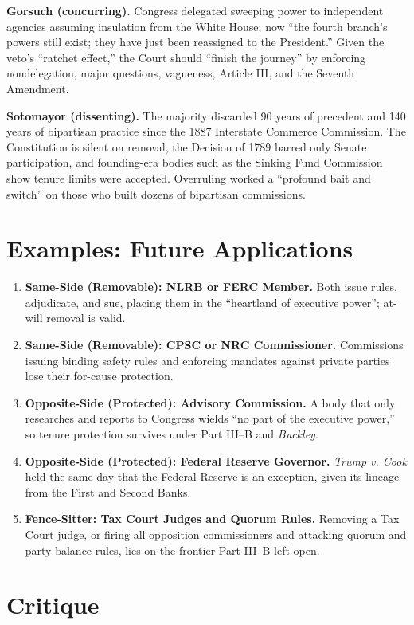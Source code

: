 \documentclass[12pt]{article}
\begin{document}
\textbf{Gorsuch (concurring).} Congress delegated sweeping power to independent agencies assuming insulation from the White House; now ``the fourth branch's powers still exist; they have just been reassigned to the President.'' Given the veto's ``ratchet effect,'' the Court should ``finish the journey'' by enforcing nondelegation, major questions, vagueness, Article III, and the Seventh Amendment.

\textbf{Sotomayor (dissenting).} The majority discarded 90 years of precedent and 140 years of bipartisan practice since the 1887 Interstate Commerce Commission. The Constitution is silent on removal, the Decision of 1789 barred only Senate participation, and founding-era bodies such as the Sinking Fund Commission show tenure limits were accepted. Overruling worked a ``profound bait and switch'' on those who built dozens of bipartisan commissions.

\section{Examples: Future Applications}

\begin{enumerate}
\item \textbf{Same-Side (Removable): NLRB or FERC Member.} Both issue rules, adjudicate, and sue, placing them in the ``heartland of executive power''; at-will removal is valid.
\item \textbf{Same-Side (Removable): CPSC or NRC Commissioner.} Commissions issuing binding safety rules and enforcing mandates against private parties lose their for-cause protection.
\item \textbf{Opposite-Side (Protected): Advisory Commission.} A body that only researches and reports to Congress wields ``no part of the executive power,'' so tenure protection survives under Part III--B and \textit{Buckley}.
\item \textbf{Opposite-Side (Protected): Federal Reserve Governor.} \textit{Trump v. Cook} held the same day that the Federal Reserve is an exception, given its lineage from the First and Second Banks.
\item \textbf{Fence-Sitter: Tax Court Judges and Quorum Rules.} Removing a Tax Court judge, or firing all opposition commissioners and attacking quorum and party-balance rules, lies on the frontier Part III--B left open.
\end{enumerate}

\section{Critique}
\end{document}
